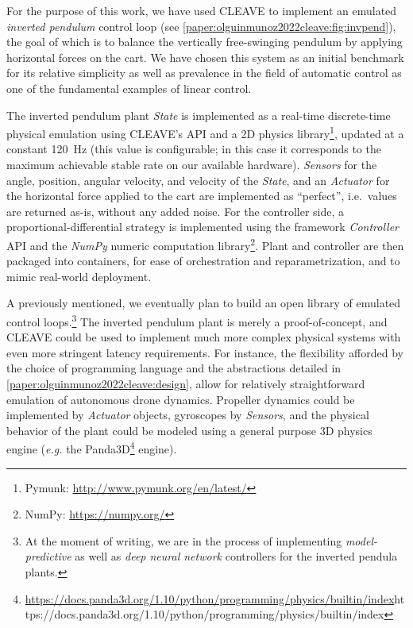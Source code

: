 For the purpose of this work, we have used \gls{CLEAVE} to implement an emulated \emph{inverted pendulum} control loop (see \cref{paper:olguinmunoz2022cleave:fig:invpend}), the goal of which is to balance the vertically free-swinging pendulum by applying horizontal forces on the cart.
We have chosen this system as an initial benchmark for its relative simplicity as well as prevalence in the field of automatic control as one of the fundamental examples of linear control.

The inverted pendulum plant \emph{State} is implemented as a real-time discrete-time physical emulation using CLEAVE's API and a 2D physics library\footnote{Pymunk: \url{http://www.pymunk.org/en/latest/}}, updated at a constant \SI{120}{\hertz} (this value is configurable; in this case it corresponds to the maximum achievable stable rate on our available hardware).
\emph{Sensors} for the angle, position, angular velocity, and velocity of the \emph{State}, and an \emph{Actuator} for the horizontal force applied to the cart are implemented as ``perfect'', i.e.\ values are returned as-is, without any added noise.
For the controller side, a proportional-differential strategy is implemented using the framework \emph{Controller} API and the \emph{NumPy} numeric computation library\footnote{NumPy: \url{https://numpy.org/}}.
Plant and controller are then packaged into containers, for ease of orchestration and reparametrization, and to mimic real-world deployment.

A previously mentioned, we eventually plan to build an open library of emulated control loops.\footnote{%
    At the moment of writing, we are in the process of implementing \emph{model-predictive} as well as \emph{deep neural network} controllers for the inverted pendula plants.%
}
The inverted pendulum plant is merely a proof-of-concept, and \gls{CLEAVE} could be used to implement much more complex physical systems with even more stringent latency requirements.
For instance, the flexibility afforded by the choice of programming language and the abstractions detailed in \cref{paper:olguinmunoz2022cleave:design}, allow for relatively straightforward emulation of autonomous drone dynamics.
Propeller dynamics could be implemented by \emph{Actuator} objects, gyroscopes by \emph{Sensors}, and the physical behavior of the plant could be modeled using a general purpose 3D physics engine (\emph{e.g.} the Panda3D\footnote{\url{https://docs.panda3d.org/1.10/python/programming/physics/builtin/index}{https://docs.panda3d.org/1.10/python/programming/physics/builtin/index}} engine).
